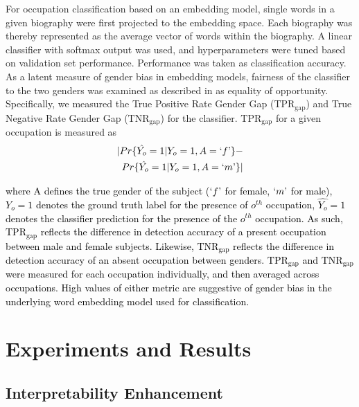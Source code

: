\documentclass[11pt,a4paper]{article}
\begin{document}
For occupation classification based on an embedding model, single words in a given biography were first projected to the embedding space. Each biography was thereby represented as the average vector of words within the biography. A linear classifier with softmax output was used, and hyperparameters were tuned based on validation set performance. Performance was taken as classification accuracy. As a latent measure of gender bias in embedding models, fairness of the classifier to the two genders was examined as described in \citep{hardt16equality} as equality of opportunity. Specifically, we measured the True Positive Rate Gender Gap ($\text{TPR}_{\text{gap}}$) and True Negative Rate Gender Gap ($\text{TNR}_{\text{gap}}$) for the classifier. $\text{TPR}_{\text{gap}}$ for a given occupation is measured as
\begin{align}
\begin{split}
    \label{eq:TPR}
    |Pr\{\hat{Y_o}=1|Y_o=1,A=`f\textrm'\} -\\ Pr\{\hat{Y_o}=1|Y_o=1,A=`m\textrm'\}|
\end{split}
\end{align}

\noindent\textcolor{black}{where A defines the true gender of the subject ($`f\textrm'$ for female, $`m\textrm'$ for male), $Y_o=1$ denotes the ground truth label for the presence of $o^{th}$ occupation, $\hat{Y_o}=1$ denotes the classifier prediction for the presence of the $o^{th}$ occupation. As such, $\text{TPR}_{\text{gap}}$ reflects the difference in detection accuracy of a present occupation between male and female subjects. Likewise, $\text{TNR}_{\text{gap}}$ reflects the difference in detection accuracy of an absent occupation between genders. $\text{TPR}_{\text{gap}}$ and $\text{TNR}_{\text{gap}}$ were measured for each occupation individually, and then averaged across occupations. High values of either metric are suggestive of gender bias in the underlying word embedding model used for classification.}

\section{Experiments and Results} \label{sec:results}

\subsection{Interpretability Enhancement}
\end{document}
